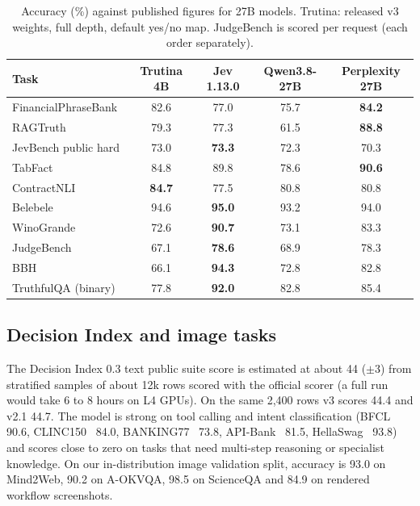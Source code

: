 \documentclass[10pt]{article}
\begin{document}
\begin{table}[t]
\centering\small
\caption{Accuracy (\%) against published figures for 27B models. Trutina: released v3 weights, full depth, default yes/no map. JudgeBench is scored per request (each order separately).}
\label{tab:27b}
\begin{tabular}{lcccc}
\toprule
Task & Trutina 4B & Jev 1.13.0 & Qwen3.8-27B & Perplexity 27B \\
\midrule
FinancialPhraseBank~\cite{fpb} & 82.6 & 77.0 & 75.7 & \textbf{84.2} \\
RAGTruth~\cite{ragtruth} & 79.3 & 77.3 & 61.5 & \textbf{88.8} \\
JevBench public hard & 73.0 & \textbf{73.3} & 72.3 & 70.3 \\
TabFact & 84.8 & 89.8 & 78.6 & \textbf{90.6} \\
ContractNLI & \textbf{84.7} & 77.5 & 80.8 & 80.8 \\
Belebele & 94.6 & \textbf{95.0} & 93.2 & 94.0 \\
WinoGrande~\cite{winogrande} & 72.6 & \textbf{90.7} & 73.1 & 83.3 \\
JudgeBench & 67.1 & \textbf{78.6} & 68.9 & 78.3 \\
BBH & 66.1 & \textbf{94.3} & 72.8 & 82.8 \\
TruthfulQA (binary)~\cite{truthfulqa} & 77.8 & \textbf{92.0} & 82.8 & 85.4 \\
\bottomrule
\end{tabular}
\end{table}

\subsection{Decision Index and image tasks}

The Decision Index 0.3 text public suite score is estimated at about 44 ($\pm 3$) from stratified samples of about 12k rows scored with the official scorer (a full run would take 6 to 8 hours on L4 GPUs).
On the same 2,400 rows v3 scores 44.4 and v2.1 44.7.
The model is strong on tool calling and intent classification (BFCL~\cite{bfcl} 90.6, CLINC150~\cite{clinc} 84.0, BANKING77~\cite{banking} 73.8, API-Bank~\cite{apibank} 81.5, HellaSwag~\cite{hellaswag} 93.8) and scores close to zero on tasks that need multi-step reasoning or specialist knowledge.
On our in-distribution image validation split, accuracy is 93.0 on Mind2Web, 90.2 on A-OKVQA, 98.5 on ScienceQA and 84.9 on rendered workflow screenshots.
\end{document}
